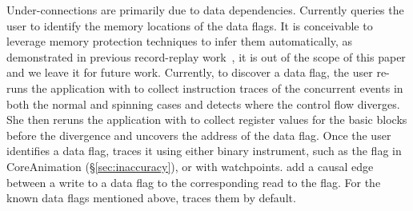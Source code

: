 Under-connections are primarily due to data dependencies.  Currently \xxx
queries the user to identify the memory locations of the data flags. It
is conceivable to leverage memory protection techniques to infer them
automatically, as demonstrated in previous record-replay
work~\cite{king2005debugging, dunlap2008execution}, it is out of the scope
of this paper and we leave it for future work. Currently, to discover a data
flag, the user re-runs the application with \xxx to collect instruction traces
of the concurrent events in both the normal and spinning cases and detects
where the control flow diverges. She then reruns the application with \xxx to
collect register values for the basic blocks before the divergence and uncovers
the address of the data flag. Once the user identifies a data flag, \xxx traces
it using either binary instrument, such as the  flag in
CoreAnimation (\S\ref{sec:inaccuracy}), or with watchpoints. \xxx add a causal
edge between a write to a data flag to the corresponding read to the flag.
For the known data flags mentioned above, \xxx traces them by default.
